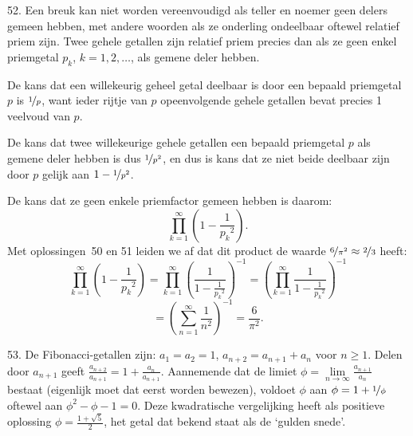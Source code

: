 \begin{problem}{52.}
    Een breuk kan niet worden vereenvoudigd als teller en noemer geen delers gemeen hebben, met andere woorden als ze onderling ondeelbaar oftewel relatief priem zijn. Twee gehele getallen zijn relatief priem precies dan als ze geen enkel priemgetal $p_k$, $k = 1,2,\dotsc$, als gemene deler hebben.

    De kans dat een willekeurig geheel getal deelbaar is door een bepaald priemgetal $p$ is $\nicefrac{1}{p}$, want ieder rijtje van $p$ opeenvolgende gehele getallen bevat precies 1 veelvoud van $p$.

    De kans dat twee willekeurige gehele getallen een bepaald priem\-getal $p$ als gemene deler hebben is dus $\nicefrac{1}{p^2}$, en dus is kans dat ze niet beide deelbaar zijn door $p$ gelijk aan $1 - \nicefrac{1}{p^2}$.

    De kans dat ze geen enkele priemfactor gemeen hebben is daarom:
    \begin{equation*}
        \textstyle\prod\limits_{k=1}^{\infty} \left( 1 - \frac{1}{{p_k}^2} \right).
    \end{equation*}
    Met oplossingen~50 en 51 leiden we af dat dit product de waarde $\nicefrac{6}{\pi^2} \approx \nicefrac{2}{3}$ heeft:
    \begin{equation*}
        \textstyle\prod\limits_{k=1}^{\infty} \left( 1 - \frac{1}{{p_k}^2} \right) = \textstyle\prod\limits_{k=1}^{\infty} {\left( \frac{1}{1 - \frac{1}{{p_k}^2}} \right)}^{-1} = {\left( \textstyle\prod\limits_{k=1}^{\infty} \frac{1}{1 - \frac{1}{{p_k}^2}} \right)}^{-1}
    \end{equation*}
    \begin{equation*}
        = {\left( \textstyle\sum\limits_{n=1}^{\infty} \frac{1}{n^2} \right)}^{-1} = \frac{6}{\pi^2}.
    \end{equation*}
\end{problem}

\begin{problem}{53.}
	De Fibonacci-getallen zijn: $a_1 = a_2 = 1$, $a_{n+2} = a_{n+1} + a_n$ voor $n \geq 1$. Delen door $a_{n+1}$ geeft $\frac{a_{n+2}}{a_{n+1}} = 1 + \frac{a_n}{a_{n+1}}$. Aannemende dat de limiet $\phi = \lim\limits_{n \to \infty} \frac{a_{n+1}}{a_n}$ bestaat (eigenlijk moet dat eerst worden bewezen), voldoet $\phi$ aan $\phi = 1 + \nicefrac{1}{\phi}$ oftewel aan $\phi^2 - \phi - 1 = 0$. Deze kwadratische vergelijking heeft als positieve oplossing $\phi = \frac{1 + \sqrt{5}}{2}$, het getal dat bekend staat als de `gulden snede'.
\end{problem}

